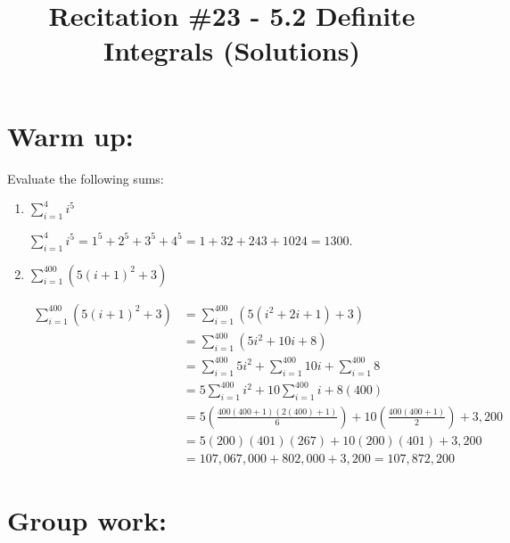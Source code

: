 \documentclass[nooutcomes]{ximera}
\title{Recitation \#23 - 5.2 Definite Integrals (Solutions)}
\begin{document}
\begin{abstract}		\end{abstract}
\maketitle

\section*{Warm up:} 
Evaluate the following sums:
	\begin{enumerate}
	
	\item $\sum_{i=1}^{4} i^5 $
		\begin{freeResponse}
		$\sum_{i=1}^{4} i^5 = 1^5 + 2^5 + 3^5 + 4^5 = 1 + 32 + 243 + 1024 = 1300$.
		\end{freeResponse}	
		
		
		
	\item $\sum_{i=1}^{400} (5(i+1)^2 + 3) $
		\begin{freeResponse}
			\begin{align*}
			\sum_{i=1}^{400} (5(i+1)^2 + 3) &= \sum_{i=1}^{400} (5(i^2 + 2i + 1) + 3) \\
			&= \sum_{i=1}^{400} (5i^2 + 10i + 8) \\
			&= \sum_{i=1}^{400} 5i^2 + \sum_{i=1}^{400} 10i + \sum_{i=1}^{400} 8  \\
			&= 5\sum_{i=1}^{400} i^2 + 10 \sum_{i=1}^{400} i + 8(400)  \\
			&= 5 \left( \frac{400(400+1)(2(400) + 1)}{6} \right) + 10 \left( \frac{400(400+1)}{2} \right) + 3,200  \\
			&= 5 (200)(401)(267) + 10(200)(401) + 3,200  \\
			&= 107,067,000 + 802,000 + 3,200 = 107,872,200
			\end{align*}
		\end{freeResponse}	
		
		
		
	\end{enumerate}
		
		
		

	
	
	
	
	

\section*{Group work:}
\end{document}
